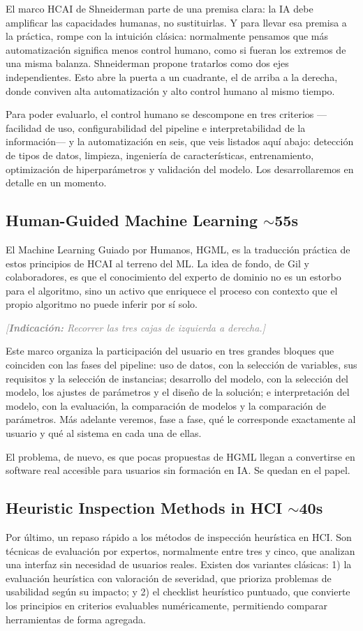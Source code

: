 \documentclass[11pt,a4paper]{article}
\newcommand{\indicacion}[1]{%
    \par\medskip
    \noindent\textcolor{gray}{\textit{[\textbf{Indicaci\'on:} #1]}}
    \par\medskip
}
\begin{document}
El marco HCAI de Shneiderman parte de una premisa clara: la IA debe amplificar las capacidades humanas, no sustituirlas. Y para llevar esa premisa a la práctica, rompe con la intuición clásica: normalmente pensamos que más automatización significa menos control humano, como si fueran los extremos de una misma balanza. Shneiderman propone tratarlos como dos ejes independientes. Esto abre la puerta a un cuadrante, el de arriba a la derecha, donde conviven alta automatización y alto control humano al mismo tiempo.

Para poder evaluarlo, el control humano se descompone en tres criterios —facilidad de uso, configurabilidad del pipeline e interpretabilidad de la información— y la automatización en seis, que veis listados aquí abajo: detección de tipos de datos, limpieza, ingeniería de características, entrenamiento, optimización de hiperparámetros y validación del modelo. Los desarrollaremos en detalle en un momento.

\subsection{Human-Guided Machine Learning \hfill \normalfont\small $\sim$55s}
El Machine Learning Guiado por Humanos, HGML, es la traducción práctica de estos principios de HCAI al terreno del ML. La idea de fondo, de Gil y colaboradores, es que el conocimiento del experto de dominio no es un estorbo para el algoritmo, sino un activo que enriquece el proceso con contexto que el propio algoritmo no puede inferir por sí solo.

\indicacion{Recorrer las tres cajas de izquierda a derecha.}
Este marco organiza la participación del usuario en tres grandes bloques que coinciden con las fases del pipeline: uso de datos, con la selección de variables, sus requisitos y la selección de instancias; desarrollo del modelo, con la selección del modelo, los ajustes de parámetros y el diseño de la solución; e interpretación del modelo, con la evaluación, la comparación de modelos y la comparación de parámetros. Más adelante veremos, fase a fase, qué le corresponde exactamente al usuario y qué al sistema en cada una de ellas.

El problema, de nuevo, es que pocas propuestas de HGML llegan a convertirse en software real accesible para usuarios sin formación en IA. Se quedan en el papel.

\subsection{Heuristic Inspection Methods in HCI \hfill \normalfont\small $\sim$40s}
Por último, un repaso rápido a los métodos de inspección heurística en HCI. Son técnicas de evaluación por expertos, normalmente entre tres y cinco, que analizan una interfaz sin necesidad de usuarios reales. Existen dos variantes clásicas: 1) la evaluación heurística con valoración de severidad, que prioriza problemas de usabilidad según su impacto; y 2) el checklist heurístico puntuado, que convierte los principios en criterios evaluables numéricamente, permitiendo comparar herramientas de forma agregada.
\end{document}
